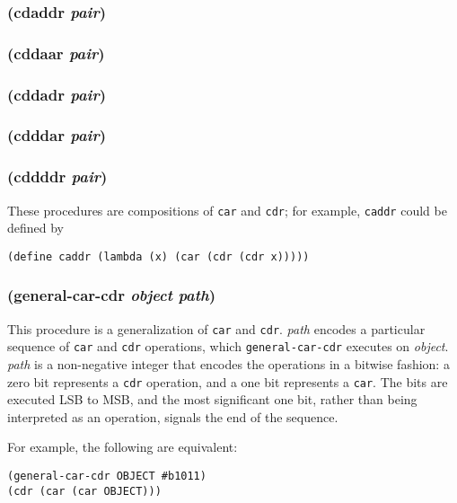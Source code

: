 \documentclass{article}
\begin{document}
\subsubsection{(cdaddr \emph{pair})}

\subsubsection{(cddaar \emph{pair})}

\subsubsection{(cddadr \emph{pair})}

\subsubsection{(cdddar \emph{pair})}

\subsubsection{(cddddr \emph{pair})}

These procedures are compositions of \verb|car| and \verb|cdr|; for example, \verb|caddr| could
be defined by

\begin{verbatim}
(define caddr (lambda (x) (car (cdr (cdr x)))))
\end{verbatim}

\subsubsection{(general-car-cdr \emph{object} \emph{path})}

This procedure is a generalization of \verb|car| and \verb|cdr|. \emph{path} encodes a
particular sequence of \verb|car| and \verb|cdr| operations, which
\verb|general-car-cdr| executes on \emph{object}. \emph{path} is a non-negative integer that
encodes the operations in a bitwise fashion: a zero bit represents a \verb|cdr| operation,
and a one bit represents a \verb|car|. The bits are executed LSB to MSB, and the most
significant one bit, rather than being interpreted as an operation, signals the end of the
sequence.

For example, the following are equivalent:

\begin{verbatim}
(general-car-cdr OBJECT #b1011)
(cdr (car (car OBJECT)))
\end{verbatim}
\end{document}
